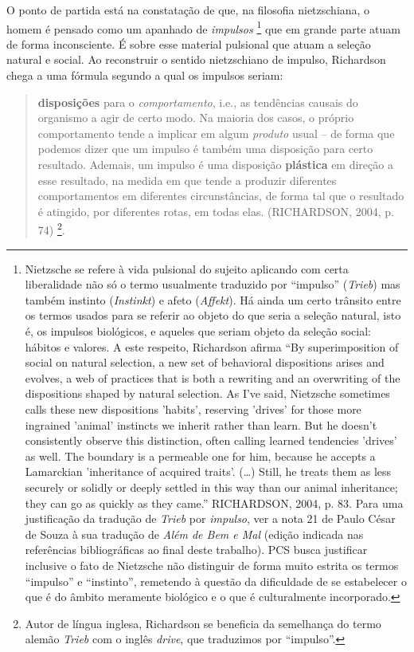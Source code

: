\documentclass[
	12pt,				%
	openright,			%
	oneside,			%
	a4paper,			%
	english,			%
	french,				%
	spanish,			%
	brazil				%
	]{abntex2}
\begin{document}
O ponto de partida está na constatação de que, na filosofia nietzschiana, o homem é pensado como um apanhado de \textit{impulsos}
\footnote{Nietzsche se refere à vida pulsional do sujeito aplicando com certa liberalidade não só o termo usualmente traduzido por “impulso” (\textit{Trieb}) mas também instinto (\textit{Instinkt}) e afeto (\textit{Affekt}). Há ainda um certo trânsito entre os termos usados para se referir ao objeto do que seria a seleção natural, isto é, os impulsos biológicos, e aqueles que seriam objeto da seleção social: hábitos e valores. A este respeito, Richardson afirma “By superimposition of social on natural selection, a new set of behavioral dispositions arises and evolves, a web of practices that is both a rewriting and an overwriting of the dispositions shaped by natural selection. As I've said, Nietzsche sometimes calls these new dispositions 'habits', reserving 'drives' for those more ingrained 'animal' instincts we inherit rather than learn. But he doesn't consistently observe this distinction, often calling learned tendencies 'drives' as well. The boundary is a permeable one for him, because he accepts a Lamarckian 'inheritance of acquired traits'. (…) Still, he treats them as less securely or solidly or deeply settled in this way than our animal inheritance; they can go as quickly as they came.” RICHARDSON, 2004, p. 83. Para uma justificação da tradução de \textit{Trieb} por \textit{impulso}, ver a nota 21 de Paulo César de Souza à sua tradução de \textit{Além de Bem e Mal} (edição indicada nas referências bibliográficas ao final deste trabalho). PCS busca justificar inclusive o fato de Nietzsche não distinguir de forma muito estrita os termos “impulso” e “instinto”, remetendo à questão da dificuldade de se estabelecer o que é do âmbito meramente biológico e o que é culturalmente incorporado.} 
que em grande parte atuam de forma inconsciente. É sobre esse material pulsional que atuam a seleção natural e social. Ao reconstruir o sentido nietzschiano de impulso, Richardson chega a uma fórmula segundo a qual os impulsos seriam:

\begin{quotation}
\textbf{disposições} para o \textit{comportamento}, i.e., as tendências causais do organismo a agir de certo modo. Na maioria dos casos, o próprio comportamento tende a implicar em algum \textit{produto} usual – de forma que podemos dizer que um impulso é também uma disposição para certo resultado. Ademais, um impulso é uma disposição \textbf{plástica} em direção a esse resultado, na medida em que tende a produzir diferentes comportamentos em diferentes circunstâncias, de forma tal que o resultado é atingido, por diferentes rotas, em todas elas. (RICHARDSON, 2004, p. 74)
\footnote{Autor de língua inglesa, Richardson se beneficia da semelhança do termo alemão \textit{Trieb} com o inglês \textit{drive}, que traduzimos por “impulso”. }.
\end{quotation}
\end{document}
